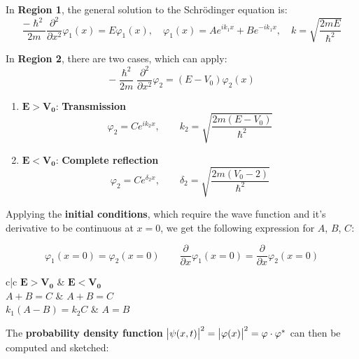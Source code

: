 \documentclass{article}
\begin{document}
\begin{twocolumn}
In \textbf{Region 1}, the general solution to the Schrödinger equation is:
$$\frac{-\hslash^2}{2m} \frac{\partial^2}{\partial x^2} \varphi_1(x) = E \varphi_1(x), \quad \varphi_1(x) = A e^{i k_1 x} + B e^{-i k_1 x}, \quad k = \sqrt{\frac{2 m E}{\hslash^2}}$$

In \textbf{Region 2}, there are two cases, which can apply:
$$-\frac{\hslash^2}{2m} \frac{\partial^2}{\partial x^2} \varphi_2 = (E - V_0) \varphi_2(x)$$

\begin{enumerate}
	\item $\mathbf{E > V_0}$: \textbf{Transmission}
	$$\varphi_2 = C e^{i k_2 x}, \qquad k_2 = \sqrt{\frac{2 m (E - V_0)}{\hslash^2}}$$
	\item $\mathbf{E < V_0}$: \textbf{Complete reflection}
	$$\varphi_2 = C e^{\delta_2 x}, \qquad \delta_2 = \sqrt{\frac{2 m (V_0 - 2)}{\hslash^2}}$$
\end{enumerate}

Applying the \textbf{initial conditions}, which require the wave function and it's derivative to be continuous at $x = 0$, we get the following expression for $A$, $B$, $C$:

$$\varphi_1(x=0) = \varphi_2(x=0) \qquad \frac{\partial }{\partial x} \varphi_1(x=0) = \frac{\partial}{\partial x} \varphi_2(x=0)$$

\begin{center}
\begin{mtabular}{c|c}
	$\mathbf{E > V_0}$ & $\mathbf{E < V_0}$ \\
	$A + B = C$ & $A + B = C$ \\
	$k_1 (A - B) = k_2 C$ & $A = B$ \\
\end{mtabular}
\end{center}

The \textbf{probability density function} $\left| \psi(x,t) \right|^2 = \left| \varphi(x) \right|^2 = \varphi \cdot \varphi^\ast$ can then be computed and sketched:


\end{twocolumn}
\end{document}
